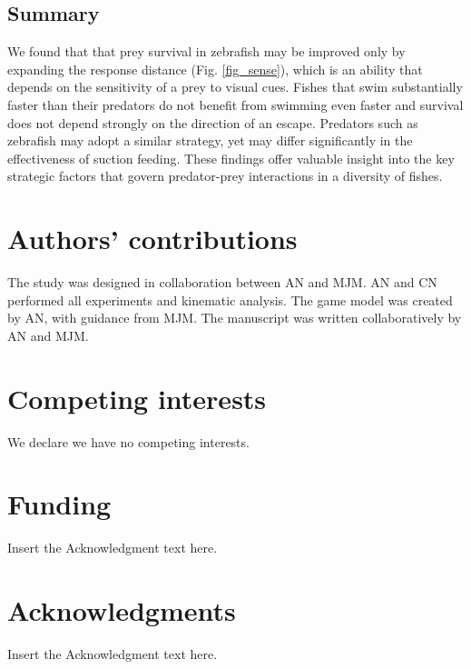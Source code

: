 \documentclass[]{rsos}%
\begin{document}
\subsection*{Summary} 

We found that that prey survival in zebrafish may be improved only by expanding the response distance (Fig. \ref{fig_sense}), which is an ability that depends on the sensitivity of a prey to visual cues. 
Fishes that swim substantially faster than their predators do not benefit from swimming even faster and survival does not depend strongly on the direction of an escape.
Predators such as zebrafish may adopt a similar strategy, yet may differ significantly in the effectiveness of suction feeding.
These findings offer valuable insight into the key strategic factors that govern predator-prey interactions in a diversity of fishes. 





\section*{Authors' contributions}
The study was designed in collaboration between AN and MJM.
AN and CN performed all experiments and kinematic analysis.
The game model was created by AN, with guidance from MJM. 
The manuscript was written collaboratively by AN and MJM.

\section*{Competing interests}
We declare we have no competing interests.

\section*{Funding}
Insert the Acknowledgment text here.

\section*{Acknowledgments}
Insert the Acknowledgment text here.



\end{document}
